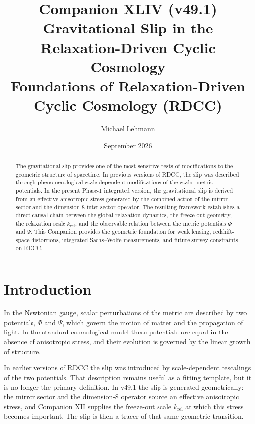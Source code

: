 \documentclass[11pt,a4paper]{article}
\title{\textbf{Companion XLIV (v49.1)}\\[0.2cm]
\textbf{Gravitational Slip in the Relaxation-Driven Cyclic Cosmology}\\[0.2cm]
\large Foundations of Relaxation-Driven Cyclic Cosmology (RDCC)}
\author[1]{Michael Lehmann}
\affil[1]{\small Independent Researcher, Relaxation-Driven Cyclic Cosmology (RDCC)\\
\texttt{mi.lehmann@gmx.de}}
\date{September 2026}
\begin{document}
\maketitle

\begin{abstract}
The gravitational slip provides one of the most sensitive tests of modifications
to the geometric structure of spacetime. In previous versions of RDCC, the slip
was described through phenomenological scale-dependent modifications of the
scalar metric potentials. In the present Phase-1 integrated version, the
gravitational slip is derived from an effective anisotropic stress generated by
the combined action of the mirror sector and the dimension-8 inter-sector
operator. The resulting framework establishes a direct causal chain between the
global relaxation dynamics, the freeze-out geometry, the relaxation scale
\(k_{\mathrm{rel}}\), and the observable relation between the metric potentials
\(\Phi\) and \(\Psi\). This Companion provides the geometric foundation for weak
lensing, redshift-space distortions, integrated Sachs--Wolfe measurements, and
future survey constraints on RDCC.
\end{abstract}

\tableofcontents
\newpage

\section{Introduction}

In the Newtonian gauge, scalar perturbations of the metric are described by two
potentials, \(\Phi\) and \(\Psi\), which govern the motion of matter and the
propagation of light. In the standard cosmological model these potentials are
equal in the absence of anisotropic stress, and their evolution is governed by
the linear growth of structure.

In earlier versions of RDCC the slip was introduced by scale-dependent
rescalings of the two potentials. That description remains useful as a fitting
template, but it is no longer the primary definition. In v49.1 the slip is
generated geometrically: the mirror sector and the dimension-8 operator source
an effective anisotropic stress, and Companion XII supplies the freeze-out scale
\(k_{\mathrm{rel}}\) at which this stress becomes important. The slip is then a
tracer of that same geometric transition.
\end{document}
